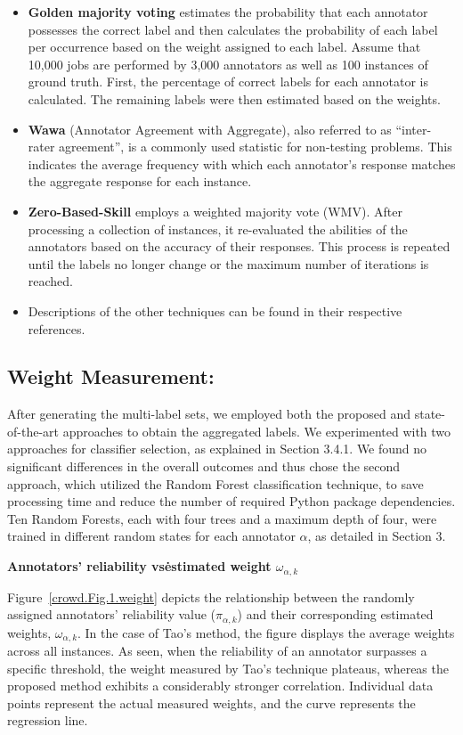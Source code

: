 \documentclass[pdflatex,bst/sn-basic]{bst/sn-jnl}%
\begin{document}
\begin{itemize}
    \item \textbf{Golden majority voting} estimates the probability that each annotator possesses the correct label and then calculates the probability of each label per occurrence based on the weight assigned to each label. Assume that 10,000 jobs are performed by 3,000 annotators as well as 100 instances of ground truth. First, the percentage of correct labels for each annotator is calculated. The remaining labels were then estimated based on the weights.
    \item \textbf{Wawa} (Annotator Agreement with Aggregate), also referred to as ``inter-rater agreement'', is a commonly used statistic for non-testing problems. This indicates the average frequency with which each annotator's response matches the aggregate response for each instance.
    \item \textbf{Zero-Based-Skill} employs a weighted majority vote (WMV). After processing a collection of instances, it re-evaluated the abilities of the annotators based on the accuracy of their responses. This process is repeated until the labels no longer change or the maximum number of iterations is reached.

    \item Descriptions of the other techniques can be found in their respective references.
\end{itemize}

\subsection{Weight Measurement:}

After generating the multi-label sets, we employed both the proposed and state-of-the-art approaches to obtain the aggregated labels. We experimented with two approaches for classifier selection, as explained in Section 3.4.1. We found no significant differences in the overall outcomes and thus chose the second approach, which utilized the Random Forest classification technique, to save processing time and reduce the number of required Python package dependencies. Ten Random Forests, each with four trees and a maximum depth of four, were trained in different random states for each annotator $\alpha $, as detailed in Section 3.

\textbf{Annotators' reliability vs\. estimated weight $\omega_{\alpha,k}$ }

Figure~\ref{crowd.Fig.1.weight} depicts the relationship between the randomly assigned annotators' reliability value ($\pi_{\alpha,k}$) and their corresponding estimated weights, $\omega_{\alpha,k}$. In the case of Tao's method, the figure displays the average weights across all instances. As seen, when the reliability of an annotator surpasses a specific threshold, the weight measured by Tao's technique plateaus, whereas the proposed method exhibits a considerably stronger correlation. Individual data points represent the actual measured weights, and the curve represents the regression line.
\end{document}
